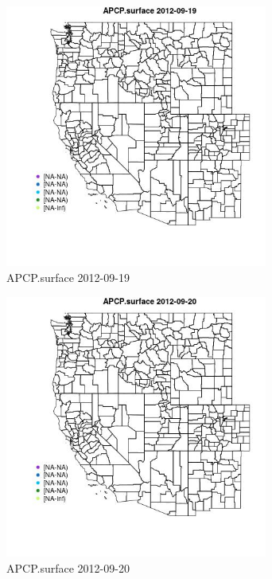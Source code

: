\begin{figure} 
\centering  
\includegraphics[width=0.77\textwidth]{Code_Outputs/ML_input_report_ML_input_PM25_Step5_part_d_de_duplicated_aves_ML_input_MapObsAPCPsurface2012-09-19.jpg} 
\caption{\label{fig:ML_input_report_ML_input_PM25_Step5_part_d_de_duplicated_aves_ML_inputMapObsAPCPsurface2012-09-19}APCP.surface 2012-09-19} 
\end{figure} 
 

\begin{figure} 
\centering  
\includegraphics[width=0.77\textwidth]{Code_Outputs/ML_input_report_ML_input_PM25_Step5_part_d_de_duplicated_aves_ML_input_MapObsAPCPsurface2012-09-20.jpg} 
\caption{\label{fig:ML_input_report_ML_input_PM25_Step5_part_d_de_duplicated_aves_ML_inputMapObsAPCPsurface2012-09-20}APCP.surface 2012-09-20} 
\end{figure} 
 

